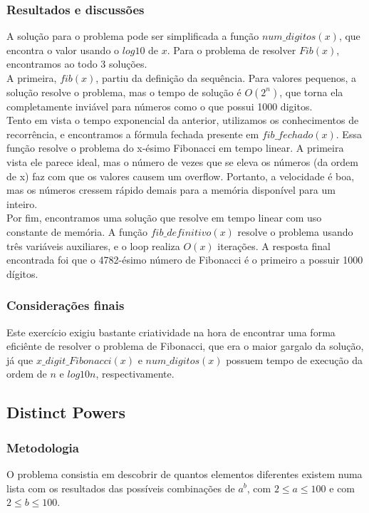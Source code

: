 \documentclass{article}
\begin{document}
        \subsubsection{Resultados e discussões}
        A solução para o problema pode ser simplificada a função $num\_digitos(x)$, que encontra o valor usando o $log10$ de $x$. Para o problema de resolver $Fib(x)$, encontramos ao todo 3 soluções.\\
        A primeira, $fib(x)$, partiu da definição da sequência. Para valores pequenos, a solução resolve o problema, mas o tempo de solução é $O(2^n)$, que torna ela completamente inviável para números como o que possui 1000 digitos.\\
        Tento em vista o tempo exponencial da anterior, utilizamos os conhecimentos de recorrência, e encontramos a fórmula fechada presente em $fib\_fechado(x)$. Essa função resolve o problema do x-ésimo Fibonacci em tempo linear. A primeira vista ele parece ideal, mas o número de vezes que se eleva os números (da ordem de x) faz com que os valores causem um overflow. Portanto, a velocidade é boa, mas os números cressem rápido demais para a memória disponível para um inteiro.\\
        Por fim, encontramos uma solução que resolve em tempo linear com uso constante de memória. A função $fib\_definitivo(x)$ resolve o problema usando três variáveis auxiliares, e o loop realiza $O(x)$ iterações.
        A resposta final encontrada foi que o 4782-ésimo número de Fibonacci é o primeiro a possuir 1000 dígitos.
        
        \subsubsection{Considerações finais}
        Este exercício exigiu bastante criatividade na hora de encontrar uma forma eficiênte de resolver o problema de Fibonacci, que era o maior gargalo da solução, já que $x\_digit\_Fibonacci(x)$ e $num\_digitos(x)$ possuem tempo de execução da ordem de $n$ e $log10 n$, respectivamente.
        
    \subsection{Distinct Powers}
        
        \subsubsection{Metodologia}
        O problema consistia em descobrir de quantos elementos diferentes existem numa lista com os resultados das possíveis combinações de $a^b$, com $2 \leq a \leq 100$ e com $2 \leq b \leq 100$.
        
\end{document}
